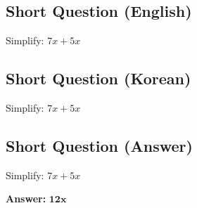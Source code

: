 \cleardoublepage
\subsection*{Short Question (English)}
Simplify: $7x + 5x$


\newpage
\subsection*{Short Question (Korean)}
Simplify: $7x + 5x$


\newpage
\subsection*{Short Question (Answer)}
Simplify: $7x + 5x$

\textbf{Answer:} $\mathbf{12x}$
